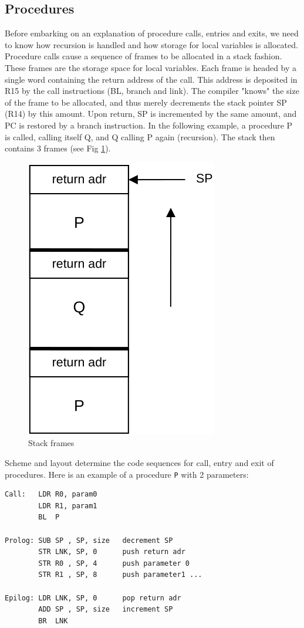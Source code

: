\subsection{Procedures}
Before embarking on an explanation of procedure calls, entries and exits, we need to know how
recursion is handled and how storage for local variables is allocated. Procedure calls cause a
sequence of frames to be allocated in a stack fashion. These frames are the storage space for local
variables. Each frame is headed by a single word containing the return address of the call. This
address is deposited in R15 by the call instructions (BL, branch and link). The compiler "knows" the
size of the frame to be allocated, and thus merely decrements the stack pointer SP (R14) by this
amount. Upon return, SP is incremented by the same amount, and PC is restored by a branch
instruction. In the following example, a procedure P is called, calling itself Q, and Q calling P again
(recursion). The stack then contains 3 frames (see Fig \ref{fig:stackfrm}).
\begin{figure}[h!]
  \centering
  \includegraphics[width=.4\textwidth]{i/C/8.png}
  \caption{Stack frames}
  \label{fig:stackfrm}
\end{figure}

Scheme and layout determine the code sequences for call, entry and exit of procedures. Here is an
example of a procedure \verb|P| with 2 parameters:
\begin{verbatim}
Call:   LDR R0, param0   
        LDR R1, param1
        BL  P
        
Prolog: SUB SP , SP, size   decrement SP        
        STR LNK, SP, 0      push return adr
        STR R0 , SP, 4      push parameter 0
        STR R1 , SP, 8      push parameter1 ...
                           
Epilog: LDR LNK, SP, 0      pop return adr
        ADD SP , SP, size   increment SP
        BR  LNK
\end{verbatim}

